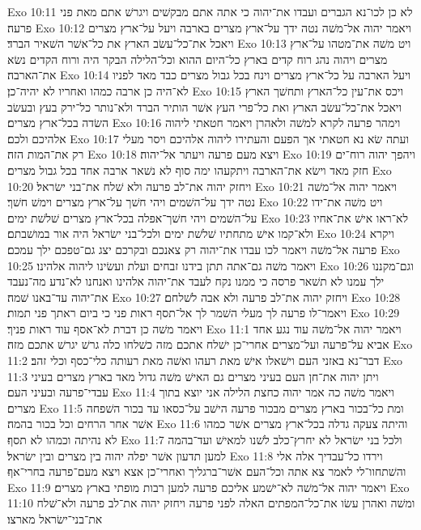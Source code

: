 Exo 10:11  לא כן לכו־נא הגברים ועבדו את־יהוה כי אתה אתם מבקשׁים ויגרשׁ אתם מאת פני פרעה׃
Exo 10:12  ויאמר יהוה אל־משׁה נטה ידך על־ארץ מצרים בארבה ויעל על־ארץ מצרים ויאכל את־כל־עשׂב הארץ את כל־אשׁר השׁאיר הברד׃
Exo 10:13  ויט משׁה את־מטהו על־ארץ מצרים ויהוה נהג רוח קדים בארץ כל־היום ההוא וכל־הלילה הבקר היה ורוח הקדים נשׂא את־הארבה׃
Exo 10:14  ויעל הארבה על כל־ארץ מצרים וינח בכל גבול מצרים כבד מאד לפניו לא־היה כן ארבה כמהו ואחריו לא יהיה־כן׃
Exo 10:15  ויכס את־עין כל־הארץ ותחשׁך הארץ ויאכל את־כל־עשׂב הארץ ואת כל־פרי העץ אשׁר הותיר הברד ולא־נותר כל־ירק בעץ ובעשׂב השׂדה בכל־ארץ מצרים׃
Exo 10:16  וימהר פרעה לקרא למשׁה ולאהרן ויאמר חטאתי ליהוה אלהיכם ולכם׃
Exo 10:17  ועתה שׂא נא חטאתי אך הפעם והעתירו ליהוה אלהיכם ויסר מעלי רק את־המות הזה׃
Exo 10:18  ויצא מעם פרעה ויעתר אל־יהוה׃
Exo 10:19  ויהפך יהוה רוח־ים חזק מאד וישׂא את־הארבה ויתקעהו ימה סוף לא נשׁאר ארבה אחד בכל גבול מצרים׃
Exo 10:20  ויחזק יהוה את־לב פרעה ולא שׁלח את־בני ישׂראל׃
Exo 10:21  ויאמר יהוה אל־משׁה נטה ידך על־השׁמים ויהי חשׁך על־ארץ מצרים וימשׁ חשׁך׃
Exo 10:22  ויט משׁה את־ידו על־השׁמים ויהי חשׁך־אפלה בכל־ארץ מצרים שׁלשׁת ימים׃
Exo 10:23  לא־ראו אישׁ את־אחיו ולא־קמו אישׁ מתחתיו שׁלשׁת ימים ולכל־בני ישׂראל היה אור במושׁבתם׃
Exo 10:24  ויקרא פרעה אל־משׁה ויאמר לכו עבדו את־יהוה רק צאנכם ובקרכם יצג גם־טפכם ילך עמכם׃
Exo 10:25  ויאמר משׁה גם־אתה תתן בידנו זבחים ועלת ועשׂינו ליהוה אלהינו׃
Exo 10:26  וגם־מקננו ילך עמנו לא תשׁאר פרסה כי ממנו נקח לעבד את־יהוה אלהינו ואנחנו לא־נדע מה־נעבד את־יהוה עד־באנו שׁמה׃
Exo 10:27  ויחזק יהוה את־לב פרעה ולא אבה לשׁלחם׃
Exo 10:28  ויאמר־לו פרעה לך מעלי השׁמר לך אל־תסף ראות פני כי ביום ראתך פני תמות׃
Exo 10:29  ויאמר משׁה כן דברת לא־אסף עוד ראות פניך׃
Exo 11:1  ויאמר יהוה אל־משׁה עוד נגע אחד אביא על־פרעה ועל־מצרים אחרי־כן ישׁלח אתכם מזה כשׁלחו כלה גרשׁ יגרשׁ אתכם מזה׃
Exo 11:2  דבר־נא באזני העם וישׁאלו אישׁ מאת רעהו ואשׁה מאת רעותה כלי־כסף וכלי זהב׃
Exo 11:3  ויתן יהוה את־חן העם בעיני מצרים גם האישׁ משׁה גדול מאד בארץ מצרים בעיני עבדי־פרעה ובעיני העם׃
Exo 11:4  ויאמר משׁה כה אמר יהוה כחצת הלילה אני יוצא בתוך מצרים׃
Exo 11:5  ומת כל־בכור בארץ מצרים מבכור פרעה הישׁב על־כסאו עד בכור השׁפחה אשׁר אחר הרחים וכל בכור בהמה׃
Exo 11:6  והיתה צעקה גדלה בכל־ארץ מצרים אשׁר כמהו לא נהיתה וכמהו לא תסף׃
Exo 11:7  ולכל בני ישׂראל לא יחרץ־כלב לשׁנו למאישׁ ועד־בהמה למען תדעון אשׁר יפלה יהוה בין מצרים ובין ישׂראל׃
Exo 11:8  וירדו כל־עבדיך אלה אלי והשׁתחוו־לי לאמר צא אתה וכל־העם אשׁר־ברגליך ואחרי־כן אצא ויצא מעם־פרעה בחרי־אף׃
Exo 11:9  ויאמר יהוה אל־משׁה לא־ישׁמע אליכם פרעה למען רבות מופתי בארץ מצרים׃
Exo 11:10  ומשׁה ואהרן עשׂו את־כל־המפתים האלה לפני פרעה ויחזק יהוה את־לב פרעה ולא־שׁלח את־בני־ישׂראל מארצו׃
